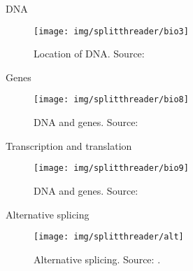 \documentclass[10pt]{beamer}
\newcommand{\1}{
        	\setbeamertemplate{background}{
        		\texttt{[image: img/1\_BIO]}
        		\tikz[overlay] \fill[fill opacity=0.75,fill=white] (0,0) rectangle (-\paperwidth,\paperheight);
        	}
}
\begin{document}
\begin{frame}{DNA}{}	
	\begin{figure}
		\centering
		\texttt{[image: img/splitthreader/bio3]}
		\caption{Location of DNA. Source: \cite{archibald2018genomics}}
	\end{figure}		
\end{frame}

\begin{frame}{Genes}{}	
	\begin{figure}
		\centering
		\texttt{[image: img/splitthreader/bio8]}
		\caption{DNA and genes. Source: \cite{archibald2018genomics}}
	\end{figure}		
\end{frame}

\begin{frame}{Transcription and translation}{}	
	\begin{figure}
		\centering
		\texttt{[image: img/splitthreader/bio9]}
		\caption{DNA and genes. Source: \cite{xiong2006essential}}
	\end{figure}		
\end{frame}

\begin{frame}{Alternative splicing}{}
	\begin{figure}[]
		\centering
		\texttt{[image: img/splitthreader/alt]}
		\label{img:mot2}
		\caption{Alternative splicing. Source: \cite{genbio2020}.}
	\end{figure}
\end{frame}
\end{document}
